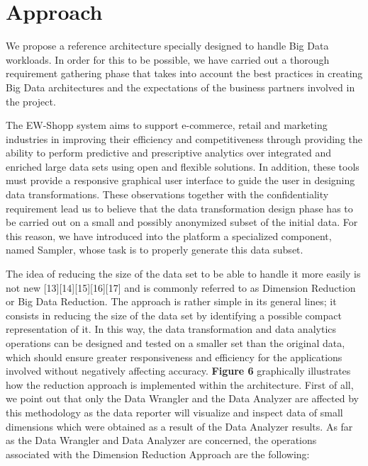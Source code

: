\section{Approach}\label{sec:approach}
We propose a reference architecture specially designed to handle Big Data workloads. 
In order for this to be possible, we have carried out a thorough requirement gathering phase that takes into account the best practices in creating Big Data architectures and the expectations of the business partners involved in the project. 


The EW-Shopp system aims to support e-commerce, retail and marketing industries in improving their efficiency and competitiveness through providing the ability to perform predictive and prescriptive analytics over integrated and enriched large data sets using open and flexible solutions. In addition, these tools must provide a responsive graphical user interface to guide the user in designing data transformations. 
These observations together with the confidentiality requirement lead us to believe that the data transformation design phase has to be carried out on a small and possibly anonymized subset of the initial data. For this reason, we have introduced into the platform a specialized component, named Sampler, whose task is to properly generate this data subset. 

The idea of reducing the size of the data set to be able to handle it more easily is not new \cite{XXX}[13][14][15][16][17]
and is commonly referred to as Dimension Reduction or Big Data Reduction. The approach is rather simple in its general lines; it consists in reducing the size of the data set by identifying a possible compact representation of it. In this way, the data transformation and data analytics operations can be designed and tested on a smaller set than the original data, which should ensure greater responsiveness and efficiency for the applications involved without negatively affecting accuracy.
\textbf{Figure 6} graphically illustrates how the reduction approach is implemented within the architecture. First of all, we point out that only the Data Wrangler and the Data Analyzer are affected by this methodology as the data reporter will visualize and inspect data of small dimensions which were obtained as a result of the Data Analyzer results. 
As far as the Data Wrangler and Data Analyzer are concerned, the operations associated with the Dimension Reduction Approach are the following:


